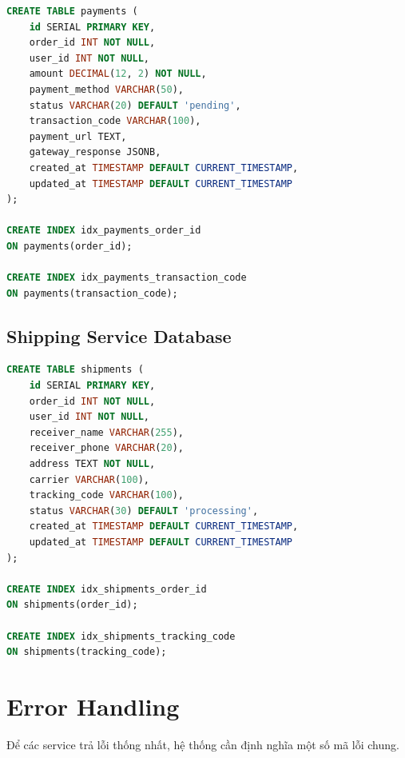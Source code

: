 \begin{lstlisting}[style=code,language=SQL]
CREATE TABLE payments (
    id SERIAL PRIMARY KEY,
    order_id INT NOT NULL,
    user_id INT NOT NULL,
    amount DECIMAL(12, 2) NOT NULL,
    payment_method VARCHAR(50),
    status VARCHAR(20) DEFAULT 'pending',
    transaction_code VARCHAR(100),
    payment_url TEXT,
    gateway_response JSONB,
    created_at TIMESTAMP DEFAULT CURRENT_TIMESTAMP,
    updated_at TIMESTAMP DEFAULT CURRENT_TIMESTAMP
);

CREATE INDEX idx_payments_order_id
ON payments(order_id);

CREATE INDEX idx_payments_transaction_code
ON payments(transaction_code);
\end{lstlisting}

\subsection{Shipping Service Database}

\begin{lstlisting}[style=code,language=SQL]
CREATE TABLE shipments (
    id SERIAL PRIMARY KEY,
    order_id INT NOT NULL,
    user_id INT NOT NULL,
    receiver_name VARCHAR(255),
    receiver_phone VARCHAR(20),
    address TEXT NOT NULL,
    carrier VARCHAR(100),
    tracking_code VARCHAR(100),
    status VARCHAR(30) DEFAULT 'processing',
    created_at TIMESTAMP DEFAULT CURRENT_TIMESTAMP,
    updated_at TIMESTAMP DEFAULT CURRENT_TIMESTAMP
);

CREATE INDEX idx_shipments_order_id
ON shipments(order_id);

CREATE INDEX idx_shipments_tracking_code
ON shipments(tracking_code);
\end{lstlisting}

\section{Error Handling}

Để các service trả lỗi thống nhất, hệ thống cần định nghĩa một số mã lỗi chung.

